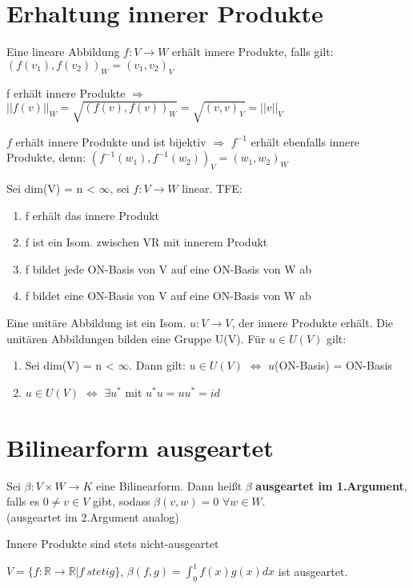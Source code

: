 \section{Erhaltung innerer Produkte}
\begin{theorem}
\leavevmode
\begin{compactitem}
\item Eine lineare Abbildung $f: V \to W$ erhält innere Produkte, falls gilt: $(f(v_1), f(v_2))_W = (v_1, v_2)_V$
\item f erhält innere Produkte $\Rightarrow$ $||f(v)||_W = \sqrt{(f(v), f(v))_W} = \sqrt{(v,v)_V} = ||v||_V$
\item $f$ erhält innere Produkte und ist bijektiv $\Rightarrow$ $f^{-1}$ erhält ebenfalls innere Produkte, denn: $(f^{-1}(w_1), f^{-1}(w_2))_V = (w_1, w_2)_W$
\item Sei dim(V) = n < $\infty$, sei $f: V \to W$ linear. TFE:
\begin{enumerate}
\item f erhält das innere Produkt
\item f ist ein Isom. zwischen VR mit innerem Produkt
\item f bildet jede ON-Basis von V auf eine ON-Basis von W ab
\item f bildet eine ON-Basis von V auf eine ON-Basis von W ab
\end{enumerate}
Eine unitäre Abbildung ist ein Isom. $u: V \to V$, der innere Produkte erhält.
Die unitären Abbildungen bilden eine Gruppe U(V). Für $u \in U(V)$ gilt:
\begin{enumerate}
\item Sei dim(V) = n < $\infty$. Dann gilt: $u \in U(V)$ $\Leftrightarrow$ $u$(ON-Basis) = ON-Basis
\item $u \in U(V)$ $\Leftrightarrow$ $\exists u^*$ mit $u^*u=uu^*=id$
\end{enumerate}
\end{compactitem}
\end{theorem}

\section{Bilinearform ausgeartet}
\begin{definition}
Sei $\beta: V \times W \to K$ eine Bilinearform. Dann heißt $\beta$ \textbf{ausgeartet im 1.Argument}, falls es $0 \neq v \in V$ gibt, sodass $\beta(v,w) = 0$ $\forall w \in W$.\\
(ausgeartet im 2.Argument analog)
\end{definition}
\begin{remark}
\leavevmode
\begin{compactitem}
\item Innere Produkte sind stets nicht-ausgeartet
\item $V = \{ f: \mathbb{R} \to \mathbb{R} | f~stetig \}$, $\beta(f,g) = \displaystyle\int_0^1 f(x) g(x) dx$ ist ausgeartet.
\end{compactitem}
\end{remark}